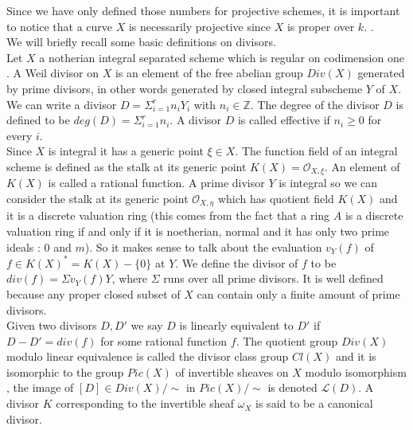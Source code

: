 \documentclass[
	oldfontcommands,
	sumario=abnt-6027-2012,
	12pt,			%
	openright,		%
	oneside,		%
	a4paper,		%
	english,		%
	brazil			%
	]{imecc-unicamp}
\begin{document}
Since we have only defined those numbers for projective schemes, it is important to notice that a curve $X$ is necessarily projective since $X$ is proper over $k$. \cite[Hartshorne II.6.7]{hartshorne_2010}.\\
We will briefly recall some basic definitions on divisors.\\
Let $X$ a notherian integral separated scheme which is regular on codimension one \cite[Hartshorne, p.130]{hartshorne_2010}. A Weil divisor on $X$ is an element of the free abelian group $Div(X)$ generated by prime divisors, in other words generated by closed integral subscheme $Y$ of $X$. We can write a divisor $D=\Sigma_{i=1}^r n_i Y_i$ with $n_i \in \mathbb{Z}$. The degree of the divisor $D$ is defined to be $deg(D)=\Sigma_{i=1}^r n_i$. A divisor $D$ is called effective if $n_i \geq 0$ for every $i$.\\
Since $X$ is integral it has a generic point $\xi \in X$. The function field of an integral scheme is defined as the stalk at its generic point $K(X)=\mathcal{O}_{X,\xi}$. An element of $K(X)$ is called a rational function. A prime divisor $Y$ is integral so we can consider the stalk at its generic point $\mathcal{O}_{X,\eta}$ which has quotient field $K(X)$ and it is a discrete valuation ring (this comes from the fact that a ring $A$ is a discrete valuation ring if and only if it is noetherian, normal and it has only two prime ideals : $0$ and $m$). So it makes sense to talk about the evaluation $v_Y(f)$ of $f \in K(X)^*=K(X)- \{ 0 \} $ at $Y$. We define the divisor of $f$ to be $div(f)=\Sigma v_Y(f)Y$, where $\Sigma$ runs over all prime divisors. It is well defined because
any proper closed subset of $X$ can contain only a finite amount of prime divisors. \cite[Hartshorne, II.6.1]{hartshorne_2010}\\
Given two divisors $D,D'$ we say $D$ is linearly equivalent to $D'$ if $D-D'=div(f)$ for some rational function $f$. The quotient group $Div(X)$ modulo linear equivalence is called the divisor class group $Cl(X)$ and it is isomorphic to the group $Pic(X)$ of invertible sheaves on $X$ modulo isomorphism \cite[Hartshorne, II.6.10]{hartshorne_2010}, the image of $[D] \in Div(X)/ \sim$ in $Pic(X)/ \sim$ is denoted $\mathcal{L}(D)$. A divisor $K$ corresponding to the invertible sheaf $\omega_X$ is said to be a canonical divisor.
\end{document}
